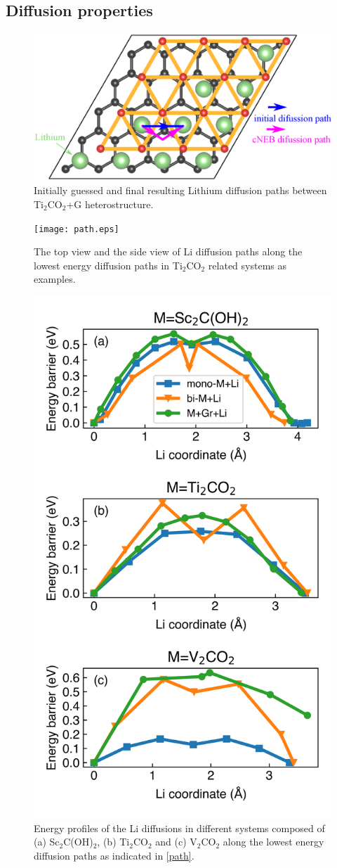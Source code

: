 \subsection{Diffusion properties}

\begin{figure}[htbp]
\centering
\includegraphics[width=0.7\linewidth]{sites_path.eps}%
\caption{Initially guessed and final resulting Lithium diffusion paths between Ti$_2$CO$_2$+G heterostructure. }
\end{figure}

\begin{figure}[htbp]
\centering
\texttt{[image: path.eps]}%
\caption{The top view and the side view of Li diffusion paths along the lowest energy diffusion paths in Ti$_2$CO$_2$ related systems as examples. \label{path}}
\end{figure}

\begin{figure}[htbp]
\centering
\includegraphics[width=0.6\linewidth]{Li_barrier.png}%
\caption{Energy profiles of the Li diffusions in different systems composed of (a) Sc$_2$C(OH)$_2$, (b) Ti$_2$CO$_2$ and (c) V$_2$CO$_2$ along the lowest energy diffusion paths as indicated in \autoref{path}. \label{barrier}}
\end{figure}

